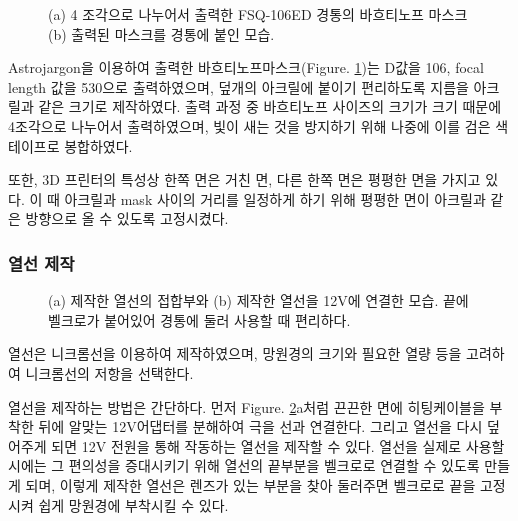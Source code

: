 \begin{figure}[ht]
	\begin{center}
	\end{center}
	\caption{(a) 4 조각으로 나누어서 출력한 FSQ-106ED 경통의 바흐티노프 마스크 (b) 출력된 마스크를 경통에 붙인 모습.}
	\label{mask}
\end{figure}

Astrojargon을 이용하여 출력한 바흐티노프마스크(\textrm{Figure}. \ref{mask})는 D값을 106, focal length 값을 530으로 출력하였으며, 덮개의 아크릴에 붙이기 편리하도록 지름을 아크릴과 같은 크기로 제작하였다. 출력 과정 중 바흐티노프 사이즈의 크기가 크기 때문에 4조각으로 나누어서 출력하였으며, 빛이 새는 것을 방지하기 위해 나중에 이를 검은 색 테이프로 봉합하였다. 

또한, 3D 프린터의 특성상 한쪽 면은 거친 면, 다른 한쪽 면은 평평한 면을 가지고 있다. 이 때 아크릴과 mask 사이의 거리를 일정하게 하기 위해 평평한 면이 아크릴과 같은 방향으로 올 수 있도록 고정시켰다.

\subsubsection{열선 제작}
\begin{figure}[h]
	\begin{center}
	\end{center}
	\caption{(a) 제작한 열선의 접합부와 (b) 제작한 열선을 12V에 연결한 모습. 끝에 벨크로가 붙어있어 경통에 둘러 사용할 때 편리하다.}
	\label{thermic}
\end{figure}

열선은  니크롬선을 이용하여 제작하였으며, 망원경의 크기와 필요한 열량 등을 고려하여 니크롬선의 저항을 선택한다.

열선을 제작하는 방법은 간단하다. 먼저 \textrm{Figure}. \ref{thermic}a처럼 끈끈한 면에 히팅케이블을 부착한 뒤에 알맞는 12V어댑터를 분해하여 극을 선과 연결한다. 그리고 열선을 다시 덮어주게 되면 12V 전원을 통해 작동하는 열선을 제작할 수 있다. 열선을 실제로 사용할 시에는 그 편의성을 증대시키기 위해 열선의 끝부분을 벨크로로 연결할 수 있도록 만들게 되며, 이렇게 제작한 열선은 렌즈가 있는 부분을 찾아 둘러주면 벨크로로 끝을 고정시켜 쉽게 망원경에 부착시킬 수 있다.

